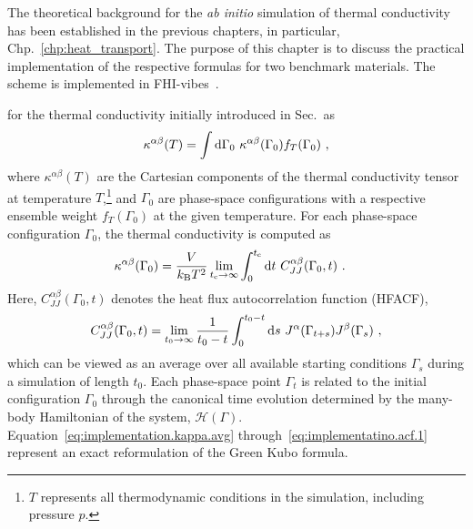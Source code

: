 
\label{chp:implementation}
\newcommand{\tcut}{t_{\rm c}}
\newcommand{\teff}{t^{\rm eff}_0}

The theoretical background for the \emph{ab initio} simulation of thermal conductivity has been established in the previous chapters, in particular, Chp.~\ref{chp:heat_transport}. The purpose of this chapter is to discuss the practical implementation of the respective formulas for two benchmark materials. The scheme is implemented in FHI-vibes~\cite{FHI-vibes}.

 for the thermal conductivity initially introduced in Sec.\, as
\begin{align}
	\kappa^{\alpha \beta} (T)
		= \int \d \Gamma_0 ~ \kappa^{\alpha \beta} (\Gamma_0) f_T (\Gamma_0) ~,
	\label{eq:implementation.kappa.avg}
\end{align}
where $\kappa^{\alpha \beta} (T)$ are the Cartesian components of the thermal conductivity tensor at temperature $T$,\footnote{$T$ represents all thermodynamic conditions in the simulation, including pressure $p$.} and $\Gamma_0$ are phase-space configurations with a respective ensemble weight $f_T (\Gamma_0)$ at the given temperature. For each phase-space configuration $\Gamma_0$, the thermal conductivity is computed as
\begin{align}
	\kappa^{\alpha \beta} (\Gamma_0)
		&=
		\frac{V}{k_{\rm B} T^2} 
		\lim_{t_{\rm c} \to \infty}
		\int_{0}^{\tcut} 
		\d t ~ C_{JJ}^{\alpha \beta} (\Gamma_0, t)~.
	\label{eq:implementatino.kappa.1}
\end{align}
Here, $	C^{\alpha \beta}_{J J} (\Gamma_0, t)$ denotes the heat flux autocorrelation function (HFACF),
\begin{align}
	C^{\alpha \beta}_{J J} (\Gamma_0, t)
		=
		\lim_{t_{0} \to \infty}
		\frac{1}{t_0 - t}
		\int_{0}^{t_{\rm 0} - t} 
		\d s ~ J^\alpha (\Gamma_{t + s}) J^\beta (\Gamma_s)~,
	\label{eq:implementatino.acf.1}
\end{align}
which can be viewed as an average over all available starting conditions $\Gamma_s$ during a simulation of length $t_0$. Each phase-space point $\Gamma_t$ is related to the initial configuration $\Gamma_0$ through the canonical time evolution determined by the many-body Hamiltonian of the system, $\mathcal H (\Gamma)$. Equation~\eqref{eq:implementation.kappa.avg} through~\eqref{eq:implementatino.acf.1} represent an exact reformulation of the Green Kubo formula.


